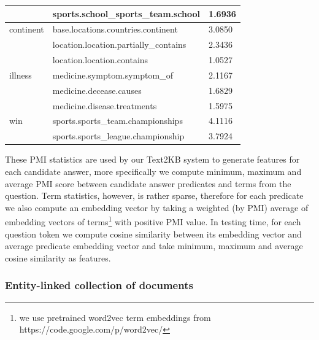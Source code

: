 \begin{table}
\begin{tabular}{| p{1.2cm} | p{5.0cm} | p{1.0cm} |}
& sports.school\_sports\_team.school & 1.6936 \\
\hline
continent & base.locations.countries.continent & 3.0850\\
& location.location.partially\_contains & 2.3436\\
& location.location.contains & 1.0527\\
\hline
illness & medicine.symptom.symptom\_of & 2.1167\\
& medicine.decease.causes & 1.6829\\
& medicine.disease.treatments & 1.5975\\
\hline
win & sports.sports\_team.championships & 4.1116\\
& sports.sports\_league.championship & 3.7924\\
\hline
\end{tabular}
\end{table}

These PMI statistics are used by our Text2KB system to generate features for each candidate answer, more specifically we compute minimum, maximum and average PMI score between candidate answer predicates and terms from the question.
Term statistics, however, is rather sparse, therefore for each predicate we also compute an embedding vector by taking a weighted (by PMI) average of embedding vectors of terms\footnote{we use pretrained word2vec term embeddings from https://code.google.com/p/word2vec/} with positive PMI value.
In testing time, for each question token we compute cosine similarity between its embedding vector and average predicate embedding vector and take minimum, maximum and average cosine similarity as features.

\subsubsection{Entity-linked collection of documents}

